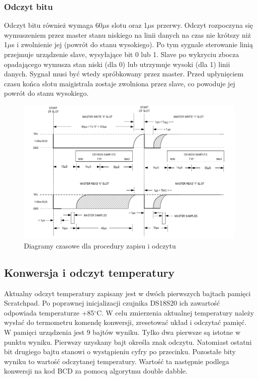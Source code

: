 \documentclass[a4paper]{article}
\begin{document}
\subsubsection{Odczyt bitu}
Odczyt bitu również wymaga 60$\mu$s slotu oraz 1$\mu$s przerwy. Odczyt rozpoczyna się wymuszeniem przez master stanu niskiego na linii danych na czas nie krótszy niż 1$\mu$s i zwolnienie jej (powrót do stanu wysokiego). Po tym sygnale sterowanie linią przejmuje urządzenie slave, wysyłające bit 0 lub 1. Slave po wykryciu zbocza opadającego wymusza stan niski (dla 0) lub utrzymuje  wysoki (dla 1) linii danych. Sygnał musi być wtedy spróbkowany przez master. Przed upłynięciem czasu końca slotu maigistrala zostaje zwolniona przez slave, co powoduje jej powrót do stanu wysokiego.

\begin{figure}[H]
\begin{center}
\includegraphics[width=14cm]{graphics/slots.png}
\end{center}
\caption{Diagramy czasowe dla procedury zapisu i odczytu}
\label{slotsitming}
\end{figure}

\subsection{Konwersja i odczyt temperatury}
Aktualny odczyt temperatury zapisany jest w dwóch pierwszych bajtach pamięci Scratchpad. Po poprawnej inicjalizacji czujnika DS18S20 ich zawartość odpowiada temperaturze +85$^\circ$C. W celu zmierzenia aktualnej temperatury należy wysłać do termometru komendę konwersji, zresetować układ i odczytać pamięć. W pamięci urządzenia jest 9 bajtów wyniku. Tylko dwa pierwsze są istotne w punktu wyniku. Pierwszy uzyskany bajt określa znak odczytu. Natomiast ostatni bit drugiego bajtu stanowi o wystąpieniu cyfry po przecinku. Pozostałe bity wyniku to wartość odczytanej temperatury.  Wartość ta następnie podlega konwersji na kod BCD za pomocą  algorytmu double dabble.
\end{document}
